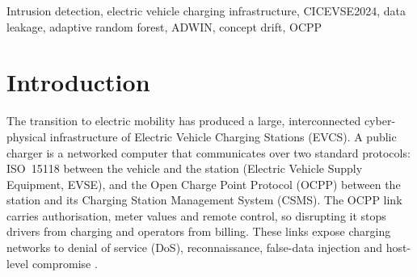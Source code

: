 \documentclass[conference]{IEEEtran}
\begin{document}
\begin{abstract}
Electric vehicle charging stations are networked computers whose compromise can halt charging, metering and billing. We present EVNet Sentinel, a network intrusion detection system for the link between charging stations and their management system, and use it to reproduce and audit the online-learning detector of Makhmudov et al. on the CICEVSE2024 dataset. We find that the published preprocessing retains absolute capture timestamps: a decision tree given one timestamp column alone recovers the fifteen-class label with 99.76 percent accuracy, above the published 98.40 percent. We further show that the drift detector fires on the seams between concatenated capture files, and that the high accuracy of streaming evaluation in capture order is matched by simply repeating the previous label. With the leakage removed and every result averaged over three seeds, volumetric floods remain perfectly separable while the six nmap reconnaissance modes are not, and an information-theoretic analysis shows this ceiling is a property of the flow features rather than of model capacity. A per-attack test harness finds that no attack passes as normal traffic, that scans are recognised as reconnaissance but rarely named exactly, and that Random Forest offers the best naming with the fewest false alarms. Requiring confidence before naming an attack converts most wrong scan names into correct category alerts. The system is delivered with a prediction service, role-based response guidance and an interactive front end built on real held-out flows.
\end{abstract}

\begin{IEEEkeywords}
Intrusion detection, electric vehicle charging infrastructure, CICEVSE2024, data leakage, adaptive random forest, ADWIN, concept drift, OCPP
\end{IEEEkeywords}

\section{Introduction}

The transition to electric mobility has produced a large, interconnected cyber-physical infrastructure of Electric Vehicle Charging Stations (EVCS). A public charger is a networked computer that communicates over two standard protocols: ISO~15118 between the vehicle and the station (Electric Vehicle Supply Equipment, EVSE), and the Open Charge Point Protocol (OCPP) between the station and its Charging Station Management System (CSMS). The OCPP link carries authorisation, meter values and remote control, so disrupting it stops drivers from charging and operators from billing. These links expose charging networks to denial of service (DoS), reconnaissance, false-data injection and host-level compromise \cite{b1,b3}.
\end{document}
